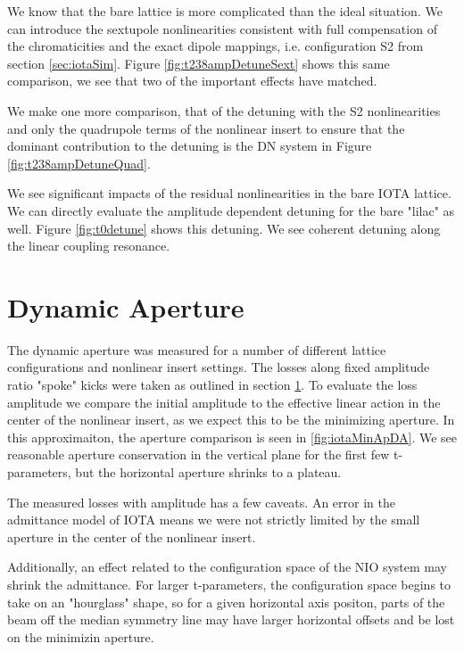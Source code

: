 We know that the bare lattice is more complicated than the ideal situation. We can introduce the sextupole nonlinearities consistent with full compensation of the chromaticities and the exact dipole mappings, i.e. configuration S2 from section \ref{sec:iotaSim}. Figure \ref{fig:t238ampDetuneSext} shows this same comparison, we see that two of the important effects have matched.

We make one more comparison, that of the detuning with the S2 nonlinearities and only the quadrupole terms of the nonlinear insert to ensure that the dominant contribution to the detuning is the DN system in Figure \ref{fig:t238ampDetuneQuad}.

We see significant impacts of the residual nonlinearities in the bare IOTA lattice. We can directly evaluate the amplitude dependent detuning for the bare "lilac" as well. Figure \ref{fig:t0detune} shows this detuning. We see coherent detuning along the linear coupling resonance.

\section{Dynamic Aperture} \label{sec:DA}
The dynamic aperture was measured for a number of different lattice configurations and nonlinear insert settings. The losses along fixed amplitude ratio "spoke" kicks were taken as outlined in section \ref{sec:DA}. To evaluate the loss amplitude we compare the initial amplitude to the effective linear action in the center of the nonlinear insert, as we expect this to be the minimizing aperture. In this approximaiton, the aperture comparison is seen in \ref{fig:iotaMinApDA}. We see reasonable aperture conservation in the vertical plane for the first few t-parameters, but the horizontal aperture shrinks to a plateau.

The measured losses with amplitude has a few caveats. An error in the admittance model of IOTA means we were not strictly limited by the small aperture in the center of the nonlinear insert.

Additionally, an effect related to the configuration space of the NIO system may shrink the admittance. For larger t-parameters, the configuration space begins to take on an "hourglass" shape, so for a given horizontal axis positon, parts of the beam off the median symmetry line may have larger horizontal offsets and be lost on the minimizin aperture.

